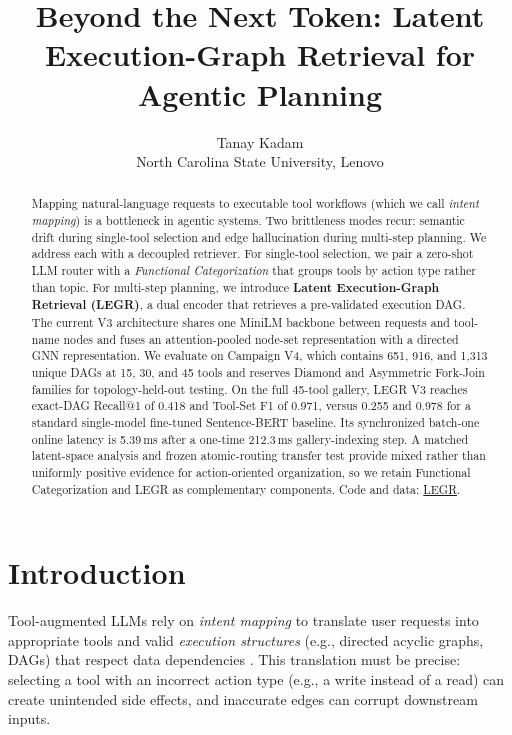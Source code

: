 \documentclass{article}
\title{Beyond the Next Token: Latent Execution-Graph Retrieval for Agentic Planning}
\author{%
  Tanay Kadam \\
  North Carolina State University, Lenovo \\
}
\begin{document}
\maketitle
\begin{abstract}
Mapping natural-language requests to executable tool workflows (which we call \emph{intent mapping}) is a bottleneck in agentic systems. Two brittleness modes recur: semantic drift during single-tool selection and edge hallucination during multi-step planning. We address each with a decoupled retriever. For single-tool selection, we pair a zero-shot LLM router with a \emph{Functional Categorization} that groups tools by action type rather than topic. For multi-step planning, we introduce \textbf{Latent Execution-Graph Retrieval (LEGR)}, a dual encoder that retrieves a pre-validated execution DAG. The current V3 architecture shares one MiniLM backbone between requests and tool-name nodes and fuses an attention-pooled node-set representation with a directed GNN representation. We evaluate on Campaign V4, which contains 651, 916, and 1,313 unique DAGs at 15, 30, and 45 tools and reserves Diamond and Asymmetric Fork-Join families for topology-held-out testing. On the full 45-tool gallery, LEGR V3 reaches exact-DAG Recall@1 of 0.418 and Tool-Set F1 of 0.971, versus 0.255 and 0.978 for a standard single-model fine-tuned Sentence-BERT baseline. Its synchronized batch-one online latency is 5.39\,ms after a one-time 212.3\,ms gallery-indexing step. A matched latent-space analysis and frozen atomic-routing transfer test provide mixed rather than uniformly positive evidence for action-oriented organization, so we retain Functional Categorization and LEGR as complementary components. Code and data: \href{https://github.com/tanay-kadam/LEGR}{LEGR}.
\end{abstract}

\section{Introduction}

Tool-augmented LLMs rely on \emph{intent mapping} to translate user requests into appropriate tools and valid \emph{execution structures} (e.g., directed acyclic graphs, DAGs) that respect data dependencies \cite{mialon2023augmented,shen2023hugginggpt,song2023restgpt}. This translation must be precise: selecting a tool with an incorrect action type (e.g., a write instead of a read) can create unintended side effects, and inaccurate edges can corrupt downstream inputs.
\end{document}
